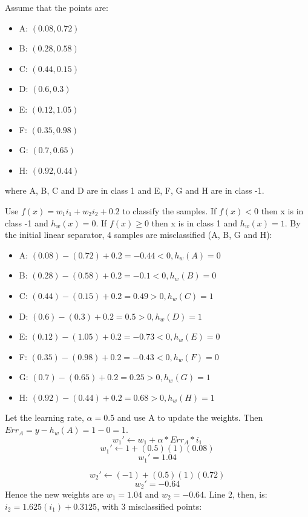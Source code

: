 \documentclass[12pt, letterpaper]{article}
\begin{document}
	\medskip 
	\noindent Assume that the points are:
	\begin{itemize}
		\item A: $(0.08, 0.72)$
		\item B: $(0.28, 0.58)$
		\item C: $(0.44, 0.15)$
		\item D: $(0.6, 0.3)$
		\item E: $(0.12, 1.05)$
		\item F: $(0.35, 0.98)$
		\item G: $(0.7, 0.65)$
		\item H: $(0.92, 0.44)$	
	\end{itemize}
	where A, B, C and D are in class 1 and E, F, G and H are in class -1. 	 
	
	Use $f(x) = w_1i_1+w_2i_2 + 0.2$ to classify the samples. If $f(x)<0$ then x is in class -1 and $h_w(x) = 0$. If $f(x) \geq 0$ then x is in class 1 and $h_w(x) = 1$. By the initial linear separator, 4 samples are misclassified (A, B, G and H):
	\begin{itemize}
		\item A: $(0.08) - (0.72) + 0.2 = -0.44 < 0, h_w(A) = 0$
		\item B: $(0.28) - (0.58) + 0.2 = -0.1 < 0, h_w(B) = 0$
		\item C: $(0.44) - (0.15) + 0.2 = 0.49 > 0, h_w(C) = 1$
		\item D: $(0.6) - (0.3) + 0.2 = 0.5 > 0, h_w(D) = 1$
		\item E: $(0.12) - (1.05) + 0.2 = -0.73 < 0, h_w(E) = 0$
		\item F: $(0.35) - (0.98) + 0.2 = -0.43 < 0, h_w(F) = 0$
		\item G: $(0.7) - (0.65) + 0.2 = 0.25 > 0, h_w(G) = 1$
		\item H: $(0.92) - (0.44) + 0.2 = 0.68 > 0, h_w(H) = 1$	
	\end{itemize} 	
	Let the learning rate, $\alpha = 0.5$ and use A to update the weights. Then $Err_A = y - h_w(A) = 1 - 0 = 1$.
	$$w_1' \leftarrow w_1 + \alpha * Err_A * i_1$$
	$$w_1' \leftarrow 1 + (0.5)(1)(0.08)$$
	$$w_1' = 1.04$$
	
	$$w_2' \leftarrow (-1) + (0.5)(1)(0.72)$$
	$$w_2' = -0.64$$
	Hence the new weights are $w_1 = 1.04$ and $w_2 = -0.64$. Line 2, then, is: $i_2 = 1.625(i_1) + 0.3125$, with 3 misclassified points:
	\medskip
	
\end{document}

